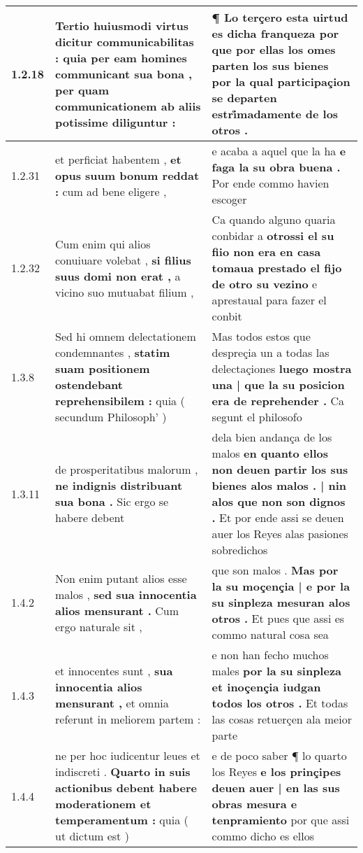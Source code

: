 \begin{tabular}{|p{1cm}|p{6.5cm}|p{6.5cm}|}
1.2.18 & Tertio huiusmodi virtus dicitur communicabilitas : \textbf{ quia per eam homines communicant sua bona , } per quam communicationem ab aliis potissime diliguntur : & ¶ Lo terçero esta uirtud es dicha franqueza \textbf{ por que por ellas los omes parten los sus bienes } por la qual participaçion se departen estri̊madamente de los otros . \\\hline
1.2.31 & et perficiat habentem , \textbf{ et opus suum bonum reddat : } cum ad bene eligere , & e acaba a aquel que la ha \textbf{ e faga la su obra buena . } Por ende commo havien escoger \\\hline
1.2.32 & Cum enim qui alios conuiuare volebat , \textbf{ si filius suus domi non erat , } a vicino suo mutuabat filium , & Ca quando alguno quaria conbidar a \textbf{ otrossi el su fiio non era en casa tomaua prestado el fijo de otro su vezino } e aprestaual para fazer el conbit \\\hline
1.3.8 & Sed hi omnem delectationem condemnantes , \textbf{ statim suam positionem ostendebant reprehensibilem : } quia ( secundum Philosoph’ ) & Mas todos estos que despreçia un a todas las delectaçiones \textbf{ luego mostra una | que la su posicion era de reprehender . } Ca segunt el philosofo \\\hline
1.3.11 & de prosperitatibus malorum , \textbf{ ne indignis distribuant sua bona . } Sic ergo se habere debent & dela bien andança de los malos \textbf{ en quanto ellos non deuen partir los sus bienes alos malos . | nin alos que non son dignos . } Et por ende assi se deuen auer los Reyes alas pasiones sobredichos \\\hline
1.4.2 & Non enim putant alios esse malos , \textbf{ sed sua innocentia alios mensurant . } Cum ergo naturale sit , & que son malos . \textbf{ Mas por la su moçençia | e por la su sinpleza mesuran alos otros . } Et pues que assi es commo natural cosa sea \\\hline
1.4.3 & et innocentes sunt , \textbf{ sua innocentia alios mensurant , } et omnia referunt in meliorem partem : & e non han fecho muchos males \textbf{ por la su sinpleza et inoçençia iudgan todos los otros . } Et todas las cosas retuerçen ala meior parte \\\hline
1.4.4 & ne per hoc iudicentur leues et indiscreti . \textbf{ Quarto in suis actionibus debent habere moderationem et temperamentum : } quia ( ut dictum est ) & e de poco saber ¶ lo quarto los Reyes \textbf{ e los prinçipes deuen auer | en las sus obras mesura e tenpramiento } por que assi commo dicho es ellos \\\hline

\end{tabular}
